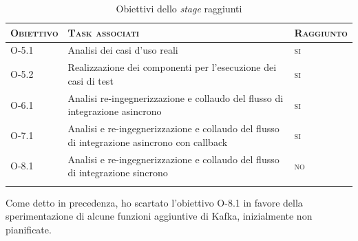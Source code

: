 \onehalfspacing
\begin{small}
  \begin{center}
    \centering
    \renewcommand\arraystretch{1.6}
    \begin{longtable}{| >{\centering\arraybackslash}m{2cm}|m{9.5cm}|>{\centering\arraybackslash}m{2.2cm}|}
      \hline
      \textsc{\textbf{Obiettivo}} & \textsc{\textbf{Task associati}} & \textsc{\textbf{Raggiunto}} \\
      \hline
      O-5.1 & Analisi dei casi d'uso reali & \textsc{si} \\
      \hline
      O-5.2 & Realizzazione dei componenti per l'esecuzione dei casi di test & \textsc{si}\\
      \Xhline{2\arrayrulewidth}
      O-6.1 & Analisi re-ingegnerizzazione e collaudo del flusso di integrazione asincrono & \textsc{si} \\
      \Xhline{2\arrayrulewidth}
      O-7.1 & Analisi e re-ingegnerizzazione e collaudo del flusso di integrazione asincrono con callback & \textsc{si}\\
      \Xhline{2\arrayrulewidth}
      O-8.1 & Analisi e re-ingegnerizzazione e collaudo del flusso di integrazione sincrono & \textsc{no}\\
      \hline

      \caption{Obiettivi dello \textit{stage} raggiunti}
    \end{longtable}
  \end{center}
\end{small}

Come detto in precedenza, ho scartato l'obiettivo O-8.1 in favore della sperimentazione di alcune funzioni aggiuntive di Kafka, inizialmente non pianificate.

%
%

